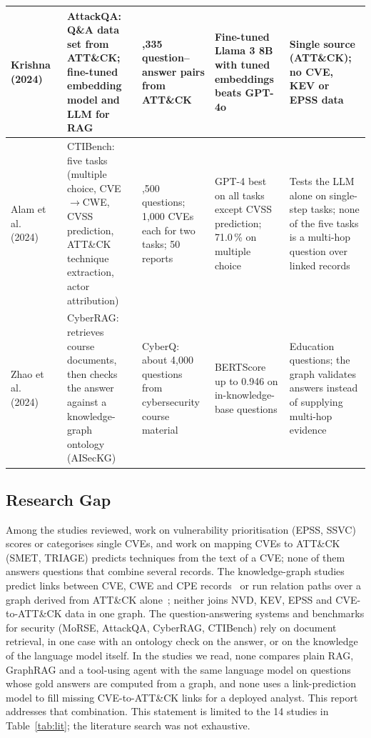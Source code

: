 \documentclass[12pt, a4paper]{article}
\newcommand{\ATTCK}{ATT\&CK}
\begin{document}
{\begin{longtable}{>{\raggedright\arraybackslash}p{2.2cm}>{\raggedright\arraybackslash}p{3.5cm}>{\raggedright\arraybackslash}p{2.6cm}>{\raggedright\arraybackslash}p{2.7cm}>{\raggedright\arraybackslash}p{3.4cm}}
Krishna~\cite{krishna2024} (2024) & AttackQA: Q\&A data set from ATT\&CK; fine-tuned embedding model and LLM for RAG & 25,335 question--answer pairs from ATT\&CK & Fine-tuned Llama 3 8B with tuned embeddings beats GPT-4o & Single source (ATT\&CK); no CVE, KEV or EPSS data \\ \midrule
Alam et al.~\cite{alam2024} (2024) & CTIBench: five tasks (multiple choice, CVE$\rightarrow$CWE, CVSS prediction, ATT\&CK technique extraction, actor attribution) & 2,500 questions; 1,000 CVEs each for two tasks; 50 reports & GPT-4 best on all tasks except CVSS prediction; 71.0\,\% on multiple choice & Tests the LLM alone on single-step tasks; none of the five tasks is a multi-hop question over linked records \\ \midrule
Zhao et al.~\cite{zhao2024} (2024) & CyberRAG: retrieves course documents, then checks the answer against a knowledge-graph ontology (AISecKG) & CyberQ: about 4,000 questions from cybersecurity course material & BERTScore up to 0.946 on in-knowledge-base questions & Education questions; the graph validates answers instead of supplying multi-hop evidence \\
\end{longtable}}
\subsection{Research Gap}
Among the studies reviewed, work on vulnerability prioritisation (EPSS, SSVC) scores or categorises single CVEs, and work on mapping CVEs to \ATTCK{} (SMET, TRIAGE) predicts techniques from the text of a CVE; none of them answers questions that combine several records. The knowledge-graph studies predict links between CVE, CWE and CPE records~\cite{shi2023} or run relation paths over a graph derived from \ATTCK{} alone~\cite{simoni2025}; neither joins NVD, KEV, EPSS and CVE-to-\ATTCK{} data in one graph. The question-answering systems and benchmarks for security (MoRSE, AttackQA, CyberRAG, CTIBench) rely on document retrieval, in one case with an ontology check on the answer, or on the knowledge of the language model itself. In the studies we read, none compares plain RAG, GraphRAG and a tool-using agent with the same language model on questions whose gold answers are computed from a graph, and none uses a link-prediction model to fill missing CVE-to-\ATTCK{} links for a deployed analyst. This report addresses that combination. This statement is limited to the 14 studies in Table~\ref{tab:lit}; the literature search was not exhaustive.
\end{document}
